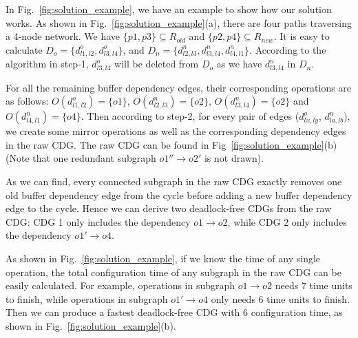 In Fig.~\ref{fig:solution_example}, we have an example to show how our solution works. As shown in Fig.~\ref{fig:solution_example}(a), there are four paths traversing a 4-node network. We have $\{p1, p3\}\subseteq R_{old}$ and $\{p2, p4\}\subseteq R_{new}$. It is easy to calculate $D_{o}=\{d^{o}_{l1,l2},  d^{o}_{l3,l4}\}$, and $D_{n}=\{d^{n}_{l2,l3},  d^{n}_{l3,l4},  d^{n}_{l4,l1}\}$.  According to the algorithm in step-1, $d^{o}_{l3,l4}$ will be deleted from $D_{o}$ as we have $d^{n}_{l3,l4}$ in $D_{n}$.

For all the remaining buffer dependency edges, their corresponding operations are as follows: $O(d^{o}_{l1,l2}) = \{o1\}$, $O(d^{n}_{l2,l3}) = \{o2\}$, $O(d^{n}_{l3,l4}) = \{o2\}$ and $O(d^{n}_{l4,l1}) = \{o4\}$. Then according to step-2, for every pair of edges ($d^{o}_{lx,ly}$,  $d^{n}_{la,lb}$), we create some mirror operations as well as the corresponding dependency edges in the raw CDG. The raw CDG can be found in Fig~\ref{fig:solution_example}(b) (Note that one redundant subgraph $o1'' \rightarrow o2'$ is not drawn).  

As we can find, every connected subgraph in the raw CDG exactly removes one old buffer dependency edge from the cycle before adding a new buffer dependency edge to the  cycle. Hence we can derive two deadlock-free CDGs from the raw CDG: CDG 1 only includes the dependency $o1\rightarrow o2$, while CDG 2 only includes the dependency $o1'\rightarrow o4$.

As shown in Fig.~\ref{fig:solution_example}, if we know the time of any single operation, the total configuration time of any subgraph in the raw CDG can be easily calculated. For example, operations in subgraph $o1 \rightarrow o2$ needs 7 time units to finish, while operations in subgraph $o1' \rightarrow o4$ only needs 6 time units to finish.  Then we can produce a fastest deadlock-free CDG with 6 configuration time, as shown in Fig.~\ref{fig:solution_example}(b).


